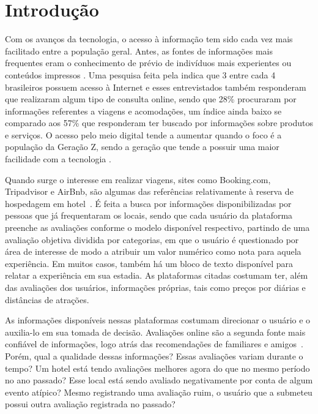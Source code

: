 
\chapter[Introdução]{Introdução}
\label{cap:intro}


Com os avanços da tecnologia, o acesso à informação tem sido cada vez mais facilitado entre a população geral. Antes, as fontes de informações mais frequentes eram o conhecimento de prévio de indivíduos mais experientes ou conteúdos impressos \cite{jayathilake2021critical}. Uma pesquisa feita pela  indica que 3 entre cada 4 brasileiros possuem acesso à Internet e esses entrevistados também responderam que realizaram algum tipo de consulta online, sendo que 28\% procuraram por informações referentes a viagens e acomodações, um índice ainda baixo se comparado aos 57\% que responderam ter buscado por informações sobre produtos e serviços. O acesso pelo meio digital tende a aumentar quando o foco é a população da Geração Z, sendo a geração que tende a possuir uma maior facilidade com a tecnologia \cite{sfodera2022technology}.

Quando surge o interesse em realizar viagens, sites como Booking.com, Tripadvisor e AirBnb, são algumas das referências relativamente à reserva de hospedagem em hotel~. É feita a busca por informações disponibilizadas por pessoas que já frequentaram os locais, sendo que cada usuário da plataforma preenche as avaliações conforme o modelo disponível respectivo, partindo de uma avaliação objetiva dividida por categorias, em que o usuário é questionado por área de interesse de modo a atribuir um valor numérico como nota para aquela experiência. Em muitos casos, também há um bloco de texto disponível para relatar a experiência em sua estadia. As plataformas citadas costumam ter, além das avaliações dos usuários, informações próprias, tais como preços por diárias e distâncias de atrações.

As informações disponíveis nessas plataformas costumam direcionar o usuário e o auxilia-lo em sua tomada de decisão. Avaliações online são a segunda fonte mais confiável de informações, logo atrás das recomendações de familiares e amigos~\cite{chatterjee2020drivers}. Porém, qual a qualidade dessas informações? Essas avaliações variam durante o tempo? Um hotel está tendo avaliações melhores agora do que no mesmo período no ano passado? Esse local está sendo avaliado negativamente por conta de algum evento atípico? Mesmo registrando uma avaliação ruim, o usuário que a submeteu possui outra avaliação registrada no passado?

